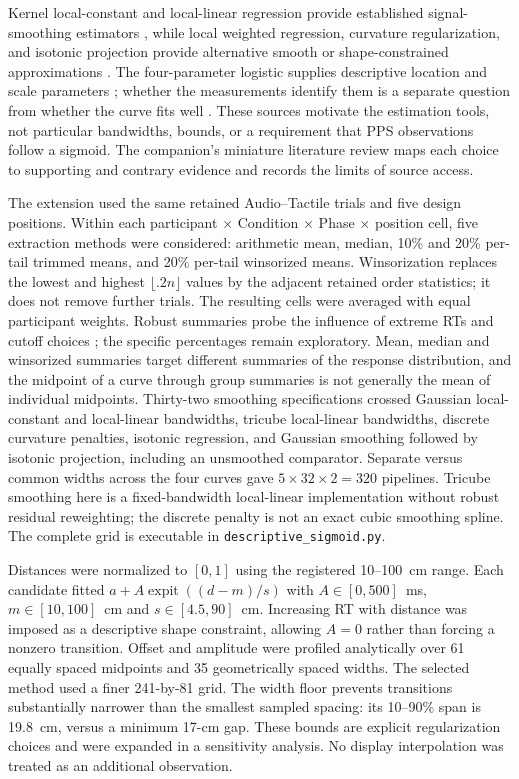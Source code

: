 Kernel local-constant and local-linear regression provide established signal-smoothing estimators \citep{LiRacine2007}, while local weighted regression, curvature regularization, and isotonic projection provide alternative smooth or shape-constrained approximations \citep{Cleveland1979,Wahba1990,Busing2022}. The four-parameter logistic supplies descriptive location and scale parameters \citep{Ritz2019}; whether the measurements identify them is a separate question from whether the curve fits well \citep{Raue2009}. These sources motivate the estimation tools, not particular bandwidths, bounds, or a requirement that PPS observations follow a sigmoid. The companion's miniature literature review maps each choice to supporting and contrary evidence and records the limits of source access.

The extension used the same retained Audio--Tactile trials and five design positions. Within each participant $\times$ Condition $\times$ Phase $\times$ position cell, five extraction methods were considered: arithmetic mean, median, 10\% and 20\% per-tail trimmed means, and 20\% per-tail winsorized means. Winsorization replaces the lowest and highest $\lfloor .2n\rfloor$ values by the adjacent retained order statistics; it does not remove further trials. The resulting cells were averaged with equal participant weights. Robust summaries probe the influence of extreme RTs and cutoff choices \citep{Ratcliff1993}; the specific percentages remain exploratory. Mean, median and winsorized summaries target different summaries of the response distribution, and the midpoint of a curve through group summaries is not generally the mean of individual midpoints. Thirty-two smoothing specifications crossed Gaussian local-constant and local-linear bandwidths, tricube local-linear bandwidths, discrete curvature penalties, isotonic regression, and Gaussian smoothing followed by isotonic projection, including an unsmoothed comparator. Separate versus common widths across the four curves gave $5\times32\times2=320$ pipelines. Tricube smoothing here is a fixed-bandwidth local-linear implementation without robust residual reweighting; the discrete penalty is not an exact cubic smoothing spline. The complete grid is executable in \texttt{descriptive\_sigmoid.py}.

Distances were normalized to $[0,1]$ using the registered 10--100~cm range. Each candidate fitted $a+A\operatorname{expit}((d-m)/s)$ with $A\in[0,500]$~ms, $m\in[10,100]$~cm and $s\in[4.5,90]$~cm. Increasing RT with distance was imposed as a descriptive shape constraint, allowing $A=0$ rather than forcing a nonzero transition. Offset and amplitude were profiled analytically over 61 equally spaced midpoints and 35 geometrically spaced widths. The selected method used a finer 241-by-81 grid. The width floor prevents transitions substantially narrower than the smallest sampled spacing: its 10--90\% span is 19.8~cm, versus a minimum 17-cm gap. These bounds are explicit regularization choices and were expanded in a sensitivity analysis. No display interpolation was treated as an additional observation.

